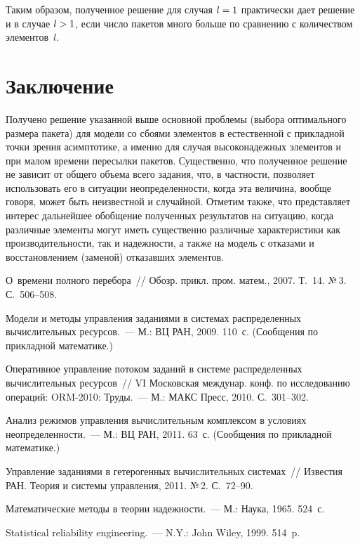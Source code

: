 \begin{multicols}{2}
\medskip

     Таким образом, полученное решение для случая $l\hm=1$ 
практически дает решение и в случае $l\hm>1$, если число пакетов много 
больше по сравнению с количеством элементов~$l$.

\section{Заключение}
     
     Получено решение указанной выше основной проблемы (выбора 
оптимального размера пакета) для модели со сбоями элементов в 
естественной с прикладной точки зрения асимптотике, а именно для случая 
высоконадежных элементов и при малом времени пересылки пакетов. 
Существенно, что полученное решение не зависит от общего объема всего 
задания, что, в частности, позволяет использовать его в ситуации 
неопределенности, когда эта величина, вообще говоря, может быть 
неизвестной и случайной. Отметим также, что представляет интерес 
дальнейшее обобщение полученных результатов на ситуацию, когда 
различные элементы могут иметь существенно различные характеристики 
как производительности, так и надежности, а также на модель с отказами и 
восстановлением (заменой) отказавших элементов. 

{\small\frenchspacing
{%
\begin{thebibliography}{9}


О~времени полного перебора~// Обозр. прикл. пром. матем., 2007. Т.~14. 
№\,3. С.~506--508.

Модели и методы управления заданиями в системах распределенных 
вычислительных ресурсов.~--- М.: ВЦ РАН, 2009. 110~с. (Сообщения по 
прикладной математике.)

Оперативное управление потоком заданий в системе распределенных 
вычислительных ресурсов~// VI Московская междунар. конф. по 
исследованию операций: ORM-2010: Труды.~--- М.: 
МАКС Пресс, 2010. С.~301--302.

Анализ режимов управления вычислительным комплексом в условиях 
неопределенности.~--- М.: ВЦ РАН, 2011. 63~с. (Сообщения по прикладной 
математике.)

Управ\-ле\-ние заданиями в гетерогенных вычислительных сис\-те\-мах~// 
Известия РАН. Теория и системы управления, 2011. №\,2. С.~72--90. 

Математические методы в теории надежности.~--- М.: Наука, 1965. 524~с. 

\label{end\stat}

Statistical reliability engineering.~--- N.Y.: John Wiley, 1999. 514~p.
 \end{thebibliography}
}
}


\end{multicols}